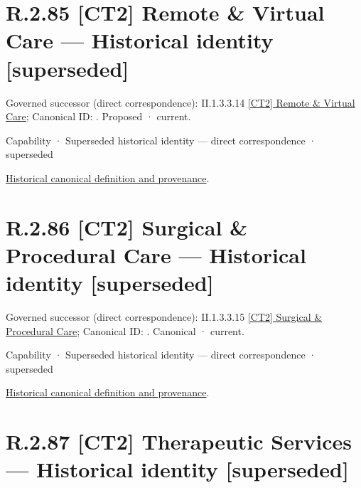 \section*{R.2.85 [CT2] Remote \& Virtual Care — Historical identity [superseded]}
\label{navigation:R.2.85}

{\small Governed successor (direct correspondence): II.1.3.3.14 \hyperref[element:30dff22d40b64da29ede7c41673db085]{[CT2] Remote \& Virtual Care}; Canonical ID: \texttt{}. Proposed · current.}\par
\label{element:75e2b447659c4fdf94107d94758337ed}
{\small Capability · Superseded historical identity — direct correspondence · superseded}\par
\href{../../../../continuum/strategy/capability/75e2b447659c4fdf94107d94758337ed.md}{Historical canonical definition and provenance}.\par
\section*{R.2.86 [CT2] Surgical \& Procedural Care — Historical identity [superseded]}
\label{navigation:R.2.86}

{\small Governed successor (direct correspondence): II.1.3.3.15 \hyperref[element:c9a26d1aa1014545b9ae759b663c807b]{[CT2] Surgical \& Procedural Care}; Canonical ID: \texttt{}. Canonical · current.}\par
\label{element:8bc2a106165a4702b5f72fe46a206b69}
{\small Capability · Superseded historical identity — direct correspondence · superseded}\par
\href{../../../../continuum/strategy/capability/8bc2a106165a4702b5f72fe46a206b69.md}{Historical canonical definition and provenance}.\par
\section*{R.2.87 [CT2] Therapeutic Services — Historical identity [superseded]}
\label{navigation:R.2.87}

